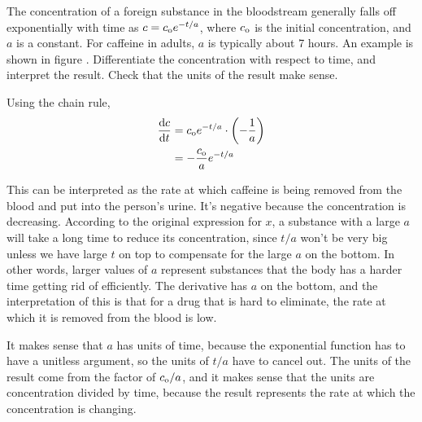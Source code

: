 \begin{eg}\label{eg:caffeine}
\egquestion The concentration of a foreign substance in the bloodstream generally falls off exponentially
with time as $c=c_{\textup{o}}e^{-t/a}$, where $c_{\textup{o}}$ is the initial concentration, and $a$ is a constant.
For caffeine in adults, $a$ is typically about 7 hours. An example is shown in figure . Differentiate the concentration with respect
to time, and interpret the result. Check that the units of the result make sense.

\eganswer Using the chain rule,
\begin{align*}
  \frac{\textup{d} c}{\textup{d} t} &= c_{\textup{o}}e^{-t/a}\cdot\left(-\frac{1}{a}\right) \\
                        &= -\frac{c_{\textup{o}}}{a}e^{-t/a}
\end{align*}

This can be interpreted as the rate at which caffeine is being removed from the blood and put into the person's urine. It's
negative because the concentration is decreasing.
According to the original expression for $x$, a substance with a large $a$ will take a long time to reduce its concentration,
since $t/a$ won't be very big unless we have large $t$ on top to compensate for the large $a$ on the bottom.
In other words, larger values of $a$ represent substances that the body has a harder time getting rid of efficiently.
The derivative has $a$ on the bottom, and the interpretation of this is that for a drug that is hard to eliminate,
the rate at which it is removed from the blood is low.

It makes sense that $a$ has units of time, because the exponential function has to have a unitless argument, so the units
of $t/a$ have to cancel out. The units of the result come from the factor of $c_{\textup{o}}/a$, and
it makes sense that the units are concentration divided by time, because the result
represents the rate at which the concentration is changing.
\end{eg}

